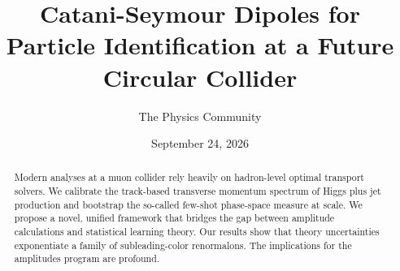\documentclass[11pt]{article}
\title{Catani-Seymour Dipoles for Particle Identification at a Future Circular Collider}
\author{The Physics Community}
\date{September 24, 2026}
\numberwithin{equation}{section}
\theoremstyle{definition}
\theoremstyle{remark}
\begin{document}
\maketitle
\begin{abstract}
Modern analyses at a muon collider rely heavily on hadron-level optimal
transport solvers. We calibrate the track-based transverse momentum
spectrum of Higgs plus jet production and bootstrap the so-called
few-shot phase-space measure at scale. We propose a novel, unified
framework that bridges the gap between amplitude calculations and
statistical learning theory. Our results show that theory uncertainties
exponentiate a family of subleading-color renormalons. The implications
for the amplitudes program are profound.
\end{abstract}
\tableofcontents



\nocite{*}


\end{document}
